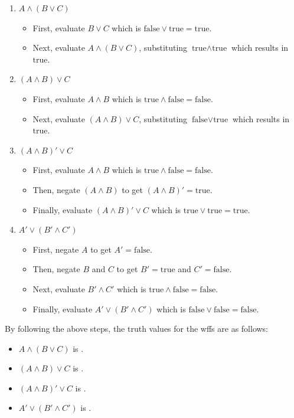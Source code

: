 \documentclass[12pt]{article}
\begin{document}
\begin{enumerate}
    \item \( A \land (B \lor C) \)
    \begin{itemize}
        \item First, evaluate \( B \lor C \) which is \( \text{false} \lor \text{true} = \text{true} \).
        \item Next, evaluate \( A \land (B \lor C) \), substituting \( \text{true} \land \text{true} \) which results in \( \text{true} \).
    \end{itemize}

    \item \( (A \land B) \lor C \)
    \begin{itemize}
        \item First, evaluate \( A \land B \) which is \( \text{true} \land \text{false} = \text{false} \).
        \item Next, evaluate \( (A \land B) \lor C \), substituting \( \text{false} \lor \text{true} \) which results in \( \text{true} \).
    \end{itemize}

    \item \( (A \land B)' \lor C \)
    \begin{itemize}
        \item First, evaluate \( A \land B \) which is \( \text{true} \land \text{false} = \text{false} \).
        \item Then, negate \( (A \land B) \) to get \( (A \land B)' = \text{true} \).
        \item Finally, evaluate \( (A \land B)' \lor C \) which is \( \text{true} \lor \text{true} = \text{true} \).
    \end{itemize}

    \item \( A' \lor (B' \land C') \)
    \begin{itemize}
        \item First, negate \( A \) to get \( A' = \text{false} \).
        \item Then, negate \( B \) and \( C \) to get \( B' = \text{true} \) and \( C' = \text{false} \).
        \item Next, evaluate \( B' \land C' \) which is \( \text{true} \land \text{false} = \text{false} \).
        \item Finally, evaluate \( A' \lor (B' \land C') \) which is \( \text{false} \lor \text{false} = \text{false} \).
    \end{itemize}
\end{enumerate}
By following the above steps, the truth values for the wffs are as follows:
\begin{itemize}
    \item \( A \land (B \lor C) \) is .
    \item \( (A \land B) \lor C \) is .
    \item \( (A \land B)' \lor C \) is .
    \item \( A' \lor (B' \land C') \) is .
\end{itemize}
\end{document}

